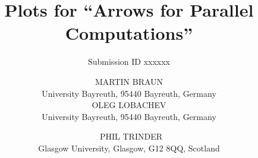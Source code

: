 \documentclass{jfp1}
\title{Plots for \enquote{Arrows for Parallel Computations}}
\author{Submission ID xxxxxx}
\author[M. Braun, O. Lobachev and P. Trinder]%
        {MARTIN BRAUN\\
         University Bayreuth, 95440 Bayreuth, Germany\\
		 OLEG LOBACHEV\\
		 University Bayreuth, 95440 Bayreuth, Germany\\
		 \and\ PHIL TRINDER\\
		 Glasgow University, Glasgow, G12 8QQ, Scotland}
\begin{document}
\label{firstpage}

\def\SymbReg{\textsuperscript{\textregistered}}

\maketitle

\tableofcontents

\newpage

\newlength{\plotwidthDist}
\setlength{\plotwidthDist}{0.6\textwidth}
\newlength{\plotwidthSMP}
\setlength{\plotwidthSMP}{0.39\textwidth}

\newcommand{\meanOverheadPlot}[5]{
\begin{tikzpicture}
\begin{axis}[title={#1},
title style={align=center},
scale only axis, width=\plotwidthDist,
xlabel=Threads,
ytick distance=#2 / 4,
xtick distance=#3,
minor tick num=9,
ylabel=Overhead,
ylabel near ticks,
grid=both,
legend entries={Mean Overhead},
legend style={at={(0.99,0.99)},anchor=north east},
max space between ticks=50pt,
grid style={line width=.1pt, draw=gray!10},
major grid style={line width=.2pt,draw=gray!50},
ymin=-#2,
ymax=#2,
xmin=-1,
xmax=#4]
\addplot+[mark=*,very thick,error bars/.cd,
    y dir=both,y explicit] table [x="nCores", y="overhead", y error="stdDevForOverhead", col sep=comma, mark=dots,
smooth]{#5};
\end{axis}
\end{tikzpicture}
}

\newcommand{\speedupplot}[8]{
\begin{tikzpicture}
\begin{axis}[title={#1},
title style={align=center},
scale only axis, width=#7,
xlabel=Threads,
xtick distance=#4,
ytick distance=#4,
ylabel=Speedup,
ylabel near ticks,
grid=major,
legend entries={linear, #2},
legend style={at={(0.01,0.99)},anchor=north west},
max space between ticks=50pt,
grid style={line width=.1pt, draw=gray!10},
major grid style={line width=.2pt,draw=gray!50},
ymin=-1,
xmin=-1,
ymax=#8,
xmax=#6]
\addplot [domain=0:#3, no markers,dotted,thick]{x};
#5
\end{axis}
\end{tikzpicture}
}

\newcommand{\rmtest}{Rabin--Miller test\xspace}
\newcommand{\sudokutest}{Sudoku\xspace}
\newcommand{\jacobitest}{Jacobi sum test\xspace}
\newcommand{\torustest}{Gentleman\xspace}

\newcommand{\benchmarkDir}{../content/benchmarks}
\end{document}
